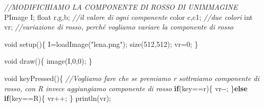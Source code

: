 \documentclass[
]{article}
\newenvironment{Shaded}{}{}
\newcommand{\CharTok}[1]{\textcolor[rgb]{0.25,0.44,0.63}{#1}}
\newcommand{\CommentTok}[1]{\textcolor[rgb]{0.38,0.63,0.69}{\textit{#1}}}
\newcommand{\ControlFlowTok}[1]{\textcolor[rgb]{0.00,0.44,0.13}{\textbf{#1}}}
\newcommand{\DataTypeTok}[1]{\textcolor[rgb]{0.56,0.13,0.00}{#1}}
\newcommand{\DecValTok}[1]{\textcolor[rgb]{0.25,0.63,0.44}{#1}}
\newcommand{\FunctionTok}[1]{\textcolor[rgb]{0.02,0.16,0.49}{#1}}
\newcommand{\NormalTok}[1]{#1}
\newcommand{\OperatorTok}[1]{\textcolor[rgb]{0.40,0.40,0.40}{#1}}
\newcommand{\StringTok}[1]{\textcolor[rgb]{0.25,0.44,0.63}{#1}}
\begin{document}
\begin{Shaded}
\begin{Highlighting}[]
\CommentTok{//MODIFICHIAMO LA COMPONENTE DI ROSSO DI UN\textquotesingle{}IMMAGINE}
\NormalTok{PImage I}\OperatorTok{;}
\DataTypeTok{float}\NormalTok{ r}\OperatorTok{,}\NormalTok{g}\OperatorTok{,}\NormalTok{b}\OperatorTok{;} \CommentTok{//il valore di ogni componente}
\NormalTok{color c}\OperatorTok{,}\NormalTok{c1}\OperatorTok{;} \CommentTok{//due colori}
\DataTypeTok{int}\NormalTok{ vr}\OperatorTok{;} \CommentTok{//variazione di rosso, perché vogliamo variare la componente di rosso}

\DataTypeTok{void} \FunctionTok{setup}\OperatorTok{()\{}
\NormalTok{  I}\OperatorTok{=}\FunctionTok{loadImage}\OperatorTok{(}\StringTok{"lena.png"}\OperatorTok{);}
  \FunctionTok{size}\OperatorTok{(}\DecValTok{512}\OperatorTok{,}\DecValTok{512}\OperatorTok{);}
\NormalTok{  vr}\OperatorTok{=}\DecValTok{0}\OperatorTok{;}
\OperatorTok{\}}

\DataTypeTok{void} \FunctionTok{draw}\OperatorTok{()\{}
  \FunctionTok{image}\OperatorTok{(}\NormalTok{I}\OperatorTok{,}\DecValTok{0}\OperatorTok{,}\DecValTok{0}\OperatorTok{);}
\OperatorTok{\}}

\DataTypeTok{void} \FunctionTok{keyPressed}\OperatorTok{()\{}
  \CommentTok{//Vogliamo fare che se premiamo r sottraiamo componente di rosso, con R invece aggiungiamo componente di rosso}
  \ControlFlowTok{if}\OperatorTok{(}\NormalTok{key}\OperatorTok{==}\CharTok{\textquotesingle{}r\textquotesingle{}}\OperatorTok{)\{}
\NormalTok{    vr}\OperatorTok{{-}{-};}
  \OperatorTok{\}}\ControlFlowTok{else} \ControlFlowTok{if}\OperatorTok{(}\NormalTok{key}\OperatorTok{==}\CharTok{\textquotesingle{}R\textquotesingle{}}\OperatorTok{)\{}
\NormalTok{    vr}\OperatorTok{++;}
  \OperatorTok{\}}
  \FunctionTok{println}\OperatorTok{(}\NormalTok{vr}\OperatorTok{);}
  

\end{Highlighting}
\end{Shaded}
\end{document}
